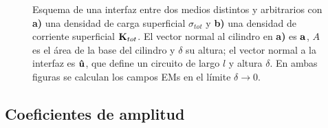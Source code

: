 \begin{figure}[t!]
\begin{subfigure}{.43\textwidth}
	\end{subfigure} \vspace*{-.7cm}
	\caption{Esquema de una interfaz entre dos medios distintos y arbitrarios con {\bf a)} una densidad de carga superficial $\sigma_{tot}$ y {\bf b)} una densidad de corriente superficial $\vb{K}_{tot}$. El vector normal al cilindro en \textbf{a)} es $\vb{a}$, $A$ es el área de la base del cilindro y $\delta$ su altura; el vector normal a la interfaz es $\vu{u}$, que define un circuito de largo $l$ y altura $\delta$. En ambas figuras se calculan los campos EMs en el límite $\delta\to 0$.}	\label{fig:GaussAmpere}	
	\end{figure}	
		
		\subsection{Coeficientes de amplitud}		
		
